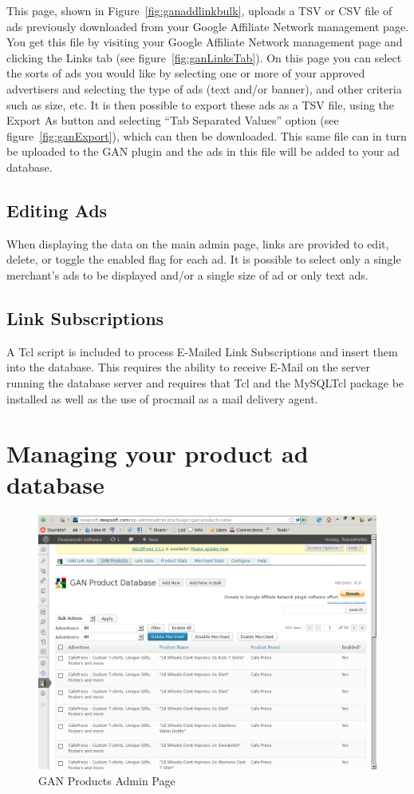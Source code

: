\documentclass[letterpaper]{article}
\begin{document}
This page, shown in Figure~\ref{fig:ganaddlinkbulk}, uploads a TSV or CSV file of ads
previously downloaded from your Google Affiliate Network management
page. You get this file by visiting your Google Affiliate Network
management page and clicking the Links tab (see
figure~\ref{fig:ganLinksTab}). On this page you can select the sorts of
ads you would like by selecting one or more of your approved
advertisers and selecting the type of ads (text and/or banner), and
other criteria such as size, etc. It is then possible to export these
ads as a TSV file, using the Export As button and selecting ``Tab
Separated Values'' option (see figure~\ref{fig:ganExport}), which can
then be downloaded. This same file can in turn be uploaded to the GAN
plugin and the ads in this file will be added to your ad database.

\subsection{Editing Ads}

When displaying the data on the main admin page, links are provided to
edit, delete, or toggle the enabled flag for each ad. It is possible to
select only a single merchant's ads to be displayed and/or a single
size of ad or only text ads.

\subsection{Link Subscriptions}

A Tcl script is included to process E-Mailed Link Subscriptions and
insert them into the database.  This requires the ability to receive
E-Mail on the server running the database server and requires that Tcl
and the MySQLTcl package be installed as well as the use of procmail as
a mail delivery agent.

\section{Managing your product ad database}

\begin{figure}[ht] \begin{centering}
\includegraphics[width=4.5in]{ganproducts.png}
\caption{GAN Products Admin Page}
\label{fig:ganproducts}
\end{centering}
\end{figure}
\end{document}

